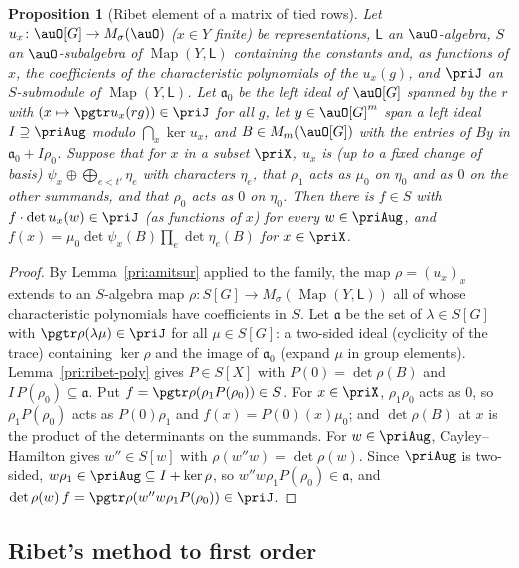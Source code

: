 \documentclass[10pt]{amsart}
\newtheorem{proposition}[theorem]{Proposition}
\theoremstyle{definition}
\theoremstyle{remark}
\begin{document}
\begin{proposition}[Ribet element of a matrix of tied rows]\label{pri:ribet-elt}
Let $u_x\colon\auO[G]\to M_\sigma(\auO)$ ($x\in Y$ finite) be representations, $\mathsf L$ an
$\auO$-algebra, $S$ an $\auO$-subalgebra of $\operatorname{Map}(Y,\mathsf L)$ containing the
constants and, as functions of $x$, the coefficients of the characteristic polynomials of the
$u_x(g)$, and $\priJ$ an $S$-submodule of $\operatorname{Map}(Y,\mathsf L)$. Let $\mathfrak a_0$ be
the left ideal of $\auO[G]$ spanned by the $r$ with $(x\mapsto\pgtr u_x(rg))\in\priJ$ for all $g$, let
$y\in\auO[G]^m$ span a left ideal $I\supseteq\priAug$ modulo $\bigcap_x\ker u_x$, and $B\in
M_m(\auO[G])$ with the entries of $By$ in $\mathfrak a_0+I\rho_0$. Suppose that for $x$ in a subset
$\priX$, $u_x$ is (up to a fixed change of basis) $\psi_x\oplus\bigoplus_{e<t'}\eta_e$ with characters
$\eta_e$, that $\rho_1$ acts as $\mu_0$ on $\eta_0$ and as $0$ on the other summands, and that
$\rho_0$ acts as $0$ on $\eta_0$. Then there is $f\in S$ with $f\cdot\det u_x(w)\in\priJ$ (as functions
of $x$) for every $w\in\priAug$, and $f(x)=\mu_0\det\psi_x(B)\prod_e\det\eta_e(B)$ for $x\in\priX$.
\end{proposition}
\begin{proof}
By Lemma~\ref{pri:amitsur} applied to the family, the map $\rho=(u_x)_x$ extends to an
$S$-algebra map $\rho\colon S[G]\to M_\sigma(\operatorname{Map}(Y,\mathsf L))$ all of whose
characteristic polynomials have coefficients in $S$. Let $\mathfrak a$ be the set of
$\lambda\in S[G]$ with $\pgtr\rho(\lambda\mu)\in\priJ$ for all $\mu\in S[G]$: a two-sided ideal
(cyclicity of the trace) containing $\ker\rho$ and the image of $\mathfrak a_0$ (expand $\mu$ in
group elements). Lemma~\ref{pri:ribet-poly} gives $P\in S[X]$ with $P(0)=\det\rho(B)$ and $I\,
P(\rho_0)\subseteq\mathfrak a$. Put $f=\pgtr\rho(\rho_1P(\rho_0))\in S$. For $x\in\priX$,
$\rho_1\rho_0$ acts as $0$, so $\rho_1P(\rho_0)$ acts as $P(0)\rho_1$ and $f(x)=P(0)(x)\mu_0$; and
$\det\rho(B)$ at $x$ is the product of the determinants on the summands. For $w\in\priAug$, Cayley--
Hamilton gives $w''\in S[w]$ with $\rho(w''w)=\det\rho(w)$. Since $\priAug$ is two-sided, $w\rho_1\in
\priAug\subseteq I+\ker\rho$, so $w''w\rho_1P(\rho_0)\in\mathfrak a$, and $\det\rho(w)\,f=\pgtr\rho(
w''w\rho_1P(\rho_0))\in\priJ$.
\end{proof}

\subsection{Ribet's method to first order}\label{pri:ss-ribet}
\end{document}
